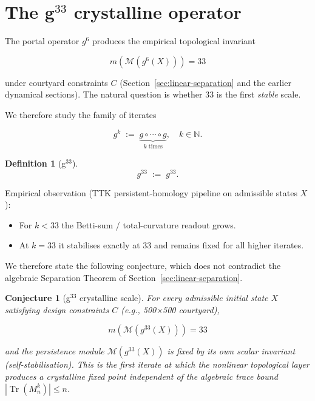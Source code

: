 \documentclass[12pt, oneside]{book}
\theoremstyle{plain}
\newtheorem{conjecture}[theorem]{Conjecture}
\theoremstyle{definition}
\newtheorem{definition}{Definition}[section]
\theoremstyle{remark}
\begin{document}
\section{The g\texorpdfstring{$^{33}$}{33} crystalline operator}
\label{sec:g33}

The portal operator \(g^6\) produces the empirical topological invariant


\[
m(\mathcal{M}(g^6(X))) = 33
\]


under courtyard constraints \(C\) (Section~\ref{sec:linear-separation} and the earlier dynamical sections).
The natural question is whether 33 is the first \emph{stable} scale.

We therefore study the family of iterates


\[
g^k \;:=\; \underbrace{g \circ \cdots \circ g}_{k \text{ times}}, \quad k \in \mathbb{N}.
\]



\begin{definition}[g\texorpdfstring{$^{33}$}{33}]


\[
g^{33} \;:=\; g^{33}.
\]


\end{definition}

Empirical observation (TTK persistent-homology pipeline on admissible states \(X\)):

\begin{itemize}[leftmargin=2em]
  \item For \(k < 33\) the Betti-sum / total-curvature readout grows.
  \item At \(k = 33\) it stabilises exactly at 33 and remains fixed for all higher iterates.
\end{itemize}

We therefore state the following conjecture, which does not contradict the algebraic Separation Theorem of Section~\ref{sec:linear-separation}.

\begin{conjecture}[g\texorpdfstring{$^{33}$}{33} crystalline scale]
\label{conj:g33}
For every admissible initial state \(X\) satisfying design constraints \(C\) (e.g., 500×500 courtyard),


\[
m(\mathcal{M}(g^{33}(X))) = 33
\]


and the persistence module \(\mathcal{M}(g^{33}(X))\) is fixed by its own scalar invariant (self-stabilisation).
This is the first iterate at which the nonlinear topological layer produces a crystalline fixed point
independent of the algebraic trace bound \(|\operatorname{Tr}(M_n^k)| \leq n\).
\end{conjecture}
\end{document}
